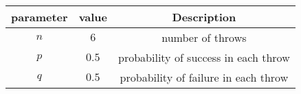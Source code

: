 
\begin{center}
\begin{tabular}{|c|c|c|}
\hline
\textbf{parameter}& \textbf{value} & \textbf{Description} \\ \hline
$n$	   	      & $6$    & number of throws\\ \hline

$p$		  & $0.5$  & probability of success in each throw\\ \hline

$q$	      & $0.5$  & probability of failure in each throw\\ \hline
\end{tabular}
\end{center}